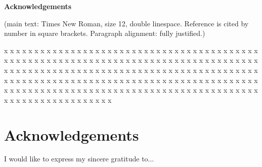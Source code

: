 \centerline{\xiaoyi\bfseries Acknowledgements}
\vspace{4em}

(main text: Times New Roman, size 12, double linespace. Reference is cited by number in square brackets. Paragraph alignment: fully justified.)

x x x x x x x x x x x x x x x x x x x x x x x x x x x x x x x x x x x x x x x x x x x x x x x x x x x x x x x x x x x x x x x x x x x x x x x x x x x x x x x x x x x x x x x x x x x x x x x x x x x x x x x x x x x x x x x x x x x x x x x x x x x x x x x x x x x x x x x x x x x x x x x x x x x x x x x x x x x x x x x x x x x x x x x x x x x x x x x x x x x x x x x x x x x x x x x x x x x x x x x x x x x x x x x x x x x x x x x x x x x x x x x x x x x x

\chapter*{Acknowledgements}

I would like to express my sincere gratitude to...


